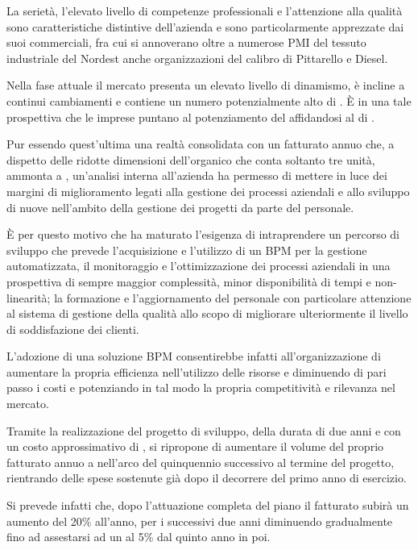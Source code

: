 La serietà, l'elevato livello di competenze professionali e l'attenzione alla qualità sono caratteristiche distintive dell'azienda e sono particolarmente apprezzate dai suoi  commerciali, fra cui si annoverano oltre a numerose PMI del tessuto industriale del Nordest anche organizzazioni del calibro di \textsf{Pittarello} e \textsf{Diesel}.

Nella fase attuale il mercato presenta un elevato livello di dinamismo, è incline a continui cambiamenti e contiene un numero potenzialmente alto di . È in una tale prospettiva che le imprese puntano al potenziamento del \mktg {} affidandosi al  di \customer.

Pur essendo quest'ultima una realtà consolidata con un fatturato annuo che, a dispetto delle ridotte dimensioni dell'organico che conta soltanto tre unità, ammonta a , un'analisi interna all'azienda ha permesso di mettere in luce dei margini di miglioramento legati alla gestione dei processi aziendali e allo sviluppo di nuove  nell'ambito della gestione dei progetti da parte del personale.

È per questo motivo che \customer ha maturato l'esigenza di intraprendere un percorso di sviluppo che prevede l'acquisizione e l'utilizzo di un \sw BPM per la gestione automatizzata, il monitoraggio e l'ottimizzazione dei processi aziendali in una prospettiva di sempre maggior complessità, minor disponibilità di tempi e non-linearità; la formazione e l'aggiornamento del personale con particolare attenzione al sistema di gestione della qualità allo scopo di migliorare ulteriormente il livello di soddisfazione dei clienti.

L'adozione di una soluzione BPM consentirebbe infatti all'organizzazione di aumentare la propria efficienza nell'utilizzo delle risorse e diminuendo di pari passo i costi e potenziando in tal modo la propria competitività e rilevanza nel mercato.

Tramite la realizzazione del progetto di sviluppo, della durata di due anni e con un costo approssimativo di , \customer si ripropone di aumentare il volume del proprio fatturato annuo a  nell'arco del quinquennio successivo al termine del progetto, rientrando delle spese sostenute già dopo il decorrere del primo anno di esercizio.

Si prevede infatti che, dopo l'attuazione completa del piano il fatturato subirà un aumento del 20\% all'anno, per i successivi due anni diminuendo gradualmente fino ad assestarsi ad un al 5\% dal quinto anno in poi.

